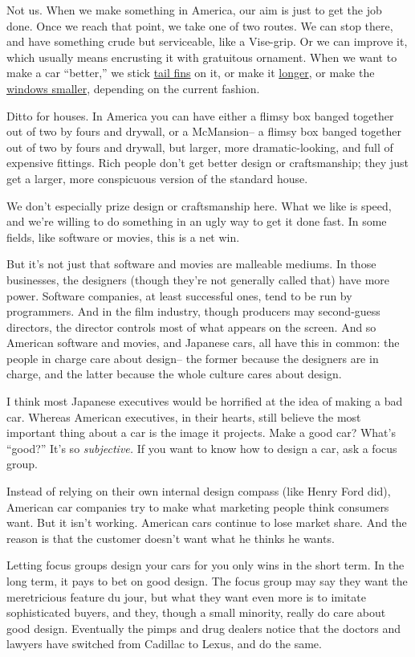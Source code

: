 Not us. When we make something in America, our aim is just to get the
job done. Once we reach that point, we take one of two routes. We can
stop there, and have something crude but serviceable, like a Vise-grip.
Or we can improve it, which usually means encrusting it with gratuitous
ornament. When we want to make a car ``better,'' we stick
\href{59eldorado.html}{tail fins} on it, or make it
\href{75eldorado.html}{longer}, or make the \href{04magnum.html}{windows
smaller}, depending on the current fashion.

Ditto for houses. In America you can have either a flimsy box banged
together out of two by fours and drywall, or a McMansion-- a flimsy box
banged together out of two by fours and drywall, but larger, more
dramatic-looking, and full of expensive fittings. Rich people don't get
better design or craftsmanship; they just get a larger, more conspicuous
version of the standard house.

We don't especially prize design or craftsmanship here. What we like is
speed, and we're willing to do something in an ugly way to get it done
fast. In some fields, like software or movies, this is a net win.

But it's not just that software and movies are malleable mediums. In
those businesses, the designers (though they're not generally called
that) have more power. Software companies, at least successful ones,
tend to be run by programmers. And in the film industry, though
producers may second-guess directors, the director controls most of what
appears on the screen. And so American software and movies, and Japanese
cars, all have this in common: the people in charge care about design--
the former because the designers are in charge, and the latter because
the whole culture cares about design.

I think most Japanese executives would be horrified at the idea of
making a bad car. Whereas American executives, in their hearts, still
believe the most important thing about a car is the image it projects.
Make a good car? What's ``good?'' It's so \emph{subjective.} If you want
to know how to design a car, ask a focus group.

Instead of relying on their own internal design compass (like Henry Ford
did), American car companies try to make what marketing people think
consumers want. But it isn't working. American cars continue to lose
market share. And the reason is that the customer doesn't want what he
thinks he wants.

Letting focus groups design your cars for you only wins in the short
term. In the long term, it pays to bet on good design. The focus group
may say they want the meretricious feature du jour, but what they want
even more is to imitate sophisticated buyers, and they, though a small
minority, really do care about good design. Eventually the pimps and
drug dealers notice that the doctors and lawyers have switched from
Cadillac to Lexus, and do the same.

